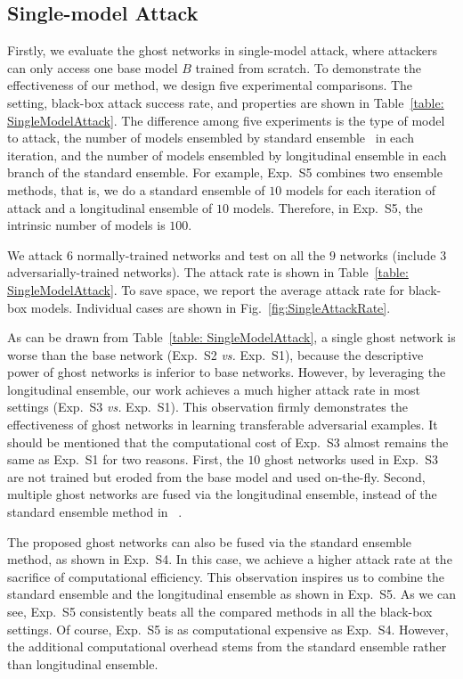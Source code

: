 \documentclass[letterpaper]{article} %
\newcommand{\citet}[1]{\citeauthor{#1} \shortcite{#1}}
\begin{document}
\subsection{Single-model Attack} \label{sec:singleModelAttackExp}

Firstly, we evaluate the ghost networks in single-model attack, where attackers can only access one base model $B$ trained from scratch. To demonstrate the effectiveness of our method, we design five experimental comparisons. The setting, black-box attack success rate, and properties are shown in Table~\ref{table: SingleModelAttack}. The difference among five experiments is the type of model to attack, the number of models ensembled by standard ensemble~\cite{liu2016delving} in each iteration, and the number of models ensembled by longitudinal ensemble in each branch of the standard ensemble. For example, Exp.~S5 combines two ensemble methods, that is, we do a standard ensemble of $10$ models for each iteration of attack and a longitudinal ensemble of $10$ models. Therefore, in Exp.~S5, the intrinsic number of models is $100$.







We attack $6$ normally-trained networks and test on all the $9$ networks (include $3$ adversarially-trained networks). The attack rate is shown in Table~\ref{table: SingleModelAttack}. To save space, we report the average attack rate for black-box models. Individual cases are shown in Fig.~\ref{fig:SingleAttackRate}.

As can be drawn from Table~\ref{table: SingleModelAttack}, a single ghost network is worse than the base network (Exp.~S2 \emph{vs.} Exp.~S1), because the descriptive power of ghost networks is inferior to base networks. However, by leveraging the longitudinal ensemble, our work achieves a much higher attack rate in most settings (Exp.~S3 \emph{vs.} Exp.~S1).
This observation firmly demonstrates the effectiveness of ghost networks in learning transferable adversarial examples. It should be mentioned that the computational cost of Exp.~S3 almost remains the same as Exp.~S1 for two reasons. First, the $10$ ghost networks used in Exp.~S3 are not trained but eroded from the base model and used on-the-fly. Second, multiple ghost networks are fused via the longitudinal ensemble, instead of the standard ensemble method in~\citet{liu2016delving}.

The proposed ghost networks can also be fused via the standard ensemble method, as shown in Exp.~S4. In this case, we achieve a higher attack rate at the sacrifice of computational efficiency. This observation inspires us to combine the standard ensemble and the longitudinal ensemble as shown in Exp.~S5. As we can see, Exp.~S5 consistently beats all the compared methods in all the black-box settings. Of course, Exp.~S5 is as computational expensive as Exp.~S4. However, the additional computational overhead stems from the standard ensemble rather than longitudinal ensemble.
\end{document}
